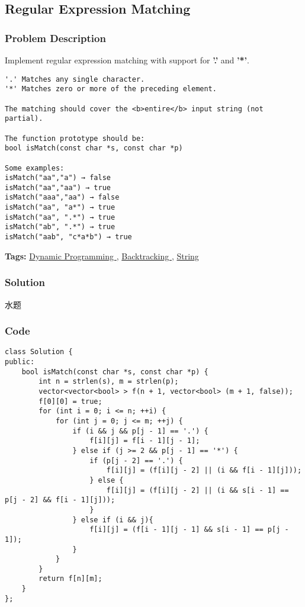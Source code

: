 \documentclass{article}
\begin{document}
\begin{CJK*}{UTF8}{gkai}
\subsection{ Regular Expression Matching }
\label{ Regular Expression Matching }

\subsubsection*{Problem Description}
Implement regular expression matching with support for \textbf{'.'} and \textbf{'*'}.

\begin{verbatim}
'.' Matches any single character.
'*' Matches zero or more of the preceding element.

The matching should cover the <b>entire</b> input string (not partial).

The function prototype should be:
bool isMatch(const char *s, const char *p)

Some examples:
isMatch("aa","a") → false
isMatch("aa","aa") → true
isMatch("aaa","aa") → false
isMatch("aa", "a*") → true
isMatch("aa", ".*") → true
isMatch("ab", ".*") → true
isMatch("aab", "c*a*b") → true
\end{verbatim}

\textbf{Tags: }
\hyperref[ Dynamic Programming ]{ Dynamic Programming },  \hyperref[ Backtracking ]{ Backtracking },  \hyperref[ String ]{ String }



\subsubsection*{Solution}
水题

\subsubsection*{Code}
\begin{lstlisting}
class Solution {
public:
    bool isMatch(const char *s, const char *p) {
        int n = strlen(s), m = strlen(p);
        vector<vector<bool> > f(n + 1, vector<bool> (m + 1, false));
        f[0][0] = true;
        for (int i = 0; i <= n; ++i) {
            for (int j = 0; j <= m; ++j) {
                if (i && j && p[j - 1] == '.') {
                    f[i][j] = f[i - 1][j - 1];
                } else if (j >= 2 && p[j - 1] == '*') {
                    if (p[j - 2] == '.') {
                        f[i][j] = (f[i][j - 2] || (i && f[i - 1][j]));
                    } else {
                        f[i][j] = (f[i][j - 2] || (i && s[i - 1] == p[j - 2] && f[i - 1][j]));
                    }
                } else if (i && j){
                    f[i][j] = (f[i - 1][j - 1] && s[i - 1] == p[j - 1]);
                }
            }
        }
        return f[n][m];
    }
}; 
\end{lstlisting}



\end{CJK*}
\end{document}
